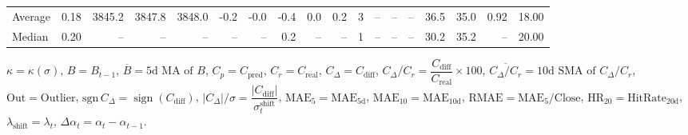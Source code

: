 \begin{threeparttable}
{\begin{tabular}{lrrrrrrrrrrrrrrrrr}
Average &     0.18 & 3845.2 & 3847.8 & 3848.0 &       -0.2 &           -0.0 &                      -0.4 &                      0.0 &                 0.2 &              3 &         -- &        -- &             -- &             36.5 &                35.0 &            0.92 &                  18.00 \\
 Median &     0.20 &     -- &     -- &     -- &         -- &             -- &                       0.2 &                       -- &                  -- &              1 &         -- &        -- &             -- &             30.2 &                35.2 &              -- &                  20.00 \\
\bottomrule
\end{tabular}
}
\begin{tablenotes}\footnotesize
\item $\kappa=\kappa(\sigma)$, $B=B_{t-1}$, $\overline{B}=\text{5d MA of }B$, $C_p=C_{\text{pred}}$, $C_r=C_{\text{real}}$, $C_\Delta=C_{\text{diff}}$, $C_\Delta/C_r=\dfrac{C_{\text{diff}}}{C_{\text{real}}}\times100$, $\overline{C_\Delta/C_r}=\text{10d SMA of }C_\Delta/C_r$, $\mathrm{Out}=\text{Outlier}$, $\mathrm{sgn}\,C_\Delta=\operatorname{sign}(C_{\text{diff}})$, $|C_\Delta|/\sigma=\dfrac{|C_{\text{diff}}|}{\sigma_t^{\text{shift}}}$, $\mathrm{MAE}_5=\mathrm{MAE}_{5\text{d}}$, $\mathrm{MAE}_{10}=\mathrm{MAE}_{10\text{d}}$, $\mathrm{RMAE}= \mathrm{MAE}_5 / \text{Close}$, $\mathrm{HR}_{20}=\mathrm{HitRate}_{20\text{d}}$, $\lambda_{\text{shift}}=\lambda_t$, $\Delta\alpha_t=\alpha_t-\alpha_{t-1}$.
\end{tablenotes}
\end{threeparttable}
\endgroup

